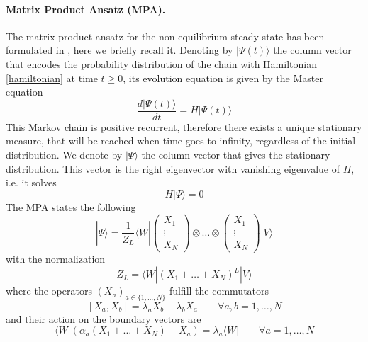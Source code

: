 \documentclass[11pt]{article}
\numberwithin{equation}{section}
\numberwithin{equation}{subsection}
\begin{document}
\paragraph{Matrix Product Ansatz (MPA).} The matrix product ansatz for the non-equilibrium steady state has been formulated in \cite{vanicat2017exact}, here we briefly recall it.
 Denoting by $|\Psi(t)\rangle$ the column vector that encodes the probability distribution of the chain with Hamiltonian \eqref{hamiltonian} at time $t\geq 0$, its evolution equation is given by 
 the Master equation
\begin{equation}
    \frac{d|{\Psi}(t)\rangle}{dt}=H|{\Psi}(t)\rangle
\end{equation}
This Markov chain is positive recurrent, therefore there exists a unique stationary measure, that will be reached when time goes to infinity, regardless of the initial distribution. 
We denote by $|\Psi\rangle$ the column vector that gives the stationary distribution. This vector is the right eigenvector with vanishing eigenvalue of $H$, i.e. it solves 
\begin{equation}
	H|\Psi\rangle =0
\end{equation}
The MPA states the following
\begin{equation}
	|\Psi\rangle=\frac{1}{Z_{L}}\langle W|\begin{pmatrix}
		X_{1}\\
		\vdots\\
		X_{N}
	\end{pmatrix}\otimes \ldots\otimes \begin{pmatrix}
		X_{1}\\
		\vdots\\
		X_{N}
	\end{pmatrix}|V\rangle
\end{equation}
with the normalization 
\begin{equation}
	Z_{L}=\langle W|(X_{1}+\ldots +X_{N})^{L}|V\rangle
\end{equation}
where the operators $(X_{a})_{a\in \{1,\ldots,N\}}$ fulfill the commutators
\begin{equation}\label{bulk}
	\left[X_{a},X_{b}\right]=\lambda_{a}X_{b}-\lambda_{b}X_{a}\qquad\forall a,b=1,\ldots,N
\end{equation}
and their action on the boundary vectors are
\begin{equation}\label{leftBoundary}
	\langle W|\left(\alpha_{a}(X_{1}+\ldots+X_{N})-X_{a}\right)=\lambda_{a}\langle W|\qquad\forall a=1,\ldots,N
\end{equation}
\end{document}
